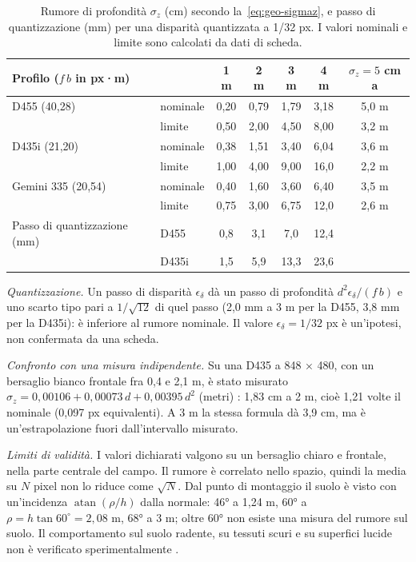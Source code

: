 \begin{table}[htb]\centering\small
\caption{Rumore di profondità $\sigma_z$ (cm) secondo la~\eqref{eq:geo-sigmaz}, e passo di quantizzazione (mm) per una disparità quantizzata a 1/32 px. I valori nominali e limite sono calcolati da dati di scheda. }\label{tab:geo-rumore}
\begin{tabular}{@{}llccccc@{}}
\toprule
Profilo ($f\,b$ in px·m) & & 1 m & 2 m & 3 m & 4 m & $\sigma_z=5$ cm a\\
\midrule
D455 (40,28) & nominale & 0,20 & 0,79 & 1,79 & 3,18 & 5,0 m\\
 & limite & 0,50 & 2,00 & 4,50 & 8,00 & 3,2 m\\
D435i (21,20) & nominale & 0,38 & 1,51 & 3,40 & 6,04 & 3,6 m\\
 & limite & 1,00 & 4,00 & 9,00 & 16,0 & 2,2 m\\
Gemini 335 (20,54) & nominale & 0,40 & 1,60 & 3,60 & 6,40 & 3,5 m\\
 & limite & 0,75 & 3,00 & 6,75 & 12,0 & 2,6 m\\
\midrule
Passo di quantizzazione (mm) & D455 & 0,8 & 3,1 & 7,0 & 12,4 & \\
 & D435i & 1,5 & 5,9 & 13,3 & 23,6 & \\
\bottomrule
\end{tabular}
\end{table}

\emph{Quantizzazione.} Un passo di disparità $\epsilon_\delta$ dà un passo di profondità $d^2\epsilon_\delta/(f\,b)$ e uno scarto tipo pari a $1/\sqrt{12}$ di quel passo (2,0 mm a 3 m per la D455, 3,8 mm per la D435i): è inferiore al rumore nominale. Il valore $\epsilon_\delta=1/32$ px è un'ipotesi, non confermata da una scheda.

\emph{Confronto con una misura indipendente.} Su una D435 a 848 × 480, con un bersaglio bianco frontale fra 0,4 e 2,1 m, è stato misurato $\sigma_z=0{,}00106+0{,}00073\,d+0{,}00395\,d^2$ (metri) \cite{ahn2019}: 1,83 cm a 2 m, cioè 1,21 volte il nominale (0,097 px equivalenti). A 3 m la stessa formula dà 3,9 cm, ma è un'estrapolazione fuori dall'intervallo misurato.

\emph{Limiti di validità.} I valori dichiarati valgono su un bersaglio chiaro e frontale, nella parte centrale del campo. Il rumore è correlato nello spazio, quindi la media su $N$ pixel non lo riduce come $\sqrt N$. Dal punto di montaggio il suolo è visto con un'incidenza $\operatorname{atan}(\rho/h)$ dalla normale: 46° a 1,24 m, 60° a $\rho=h\tan 60^\circ=2{,}08$ m, 68° a 3 m; oltre 60° non esiste una misura del rumore sul suolo. Il comportamento sul suolo radente, su tessuti scuri e su superfici lucide non è verificato sperimentalmente .

